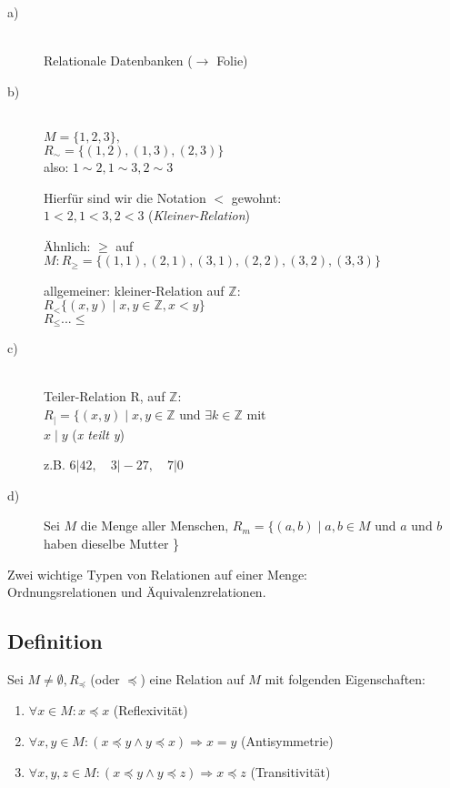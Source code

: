 \documentclass[a4paper, 12pt, twoside] {article}
\begin{document}
\begin{description}
\item[a)] \hfill \\
Relationale Datenbanken ($\rightarrow$ Folie)

\item[b)] \hfill \\
$M = \{1, 2, 3 \} ,$ \\
$R_{\sim} = \{(1, 2), (1, 3), (2, 3) \}$ \\
also: $1 \sim 2, 1  \sim 3, 2  \sim 3$

Hierfür sind wir die Notation \textit{$<$} gewohnt: \\
$1 < 2, 1 < 3, 2 < 3$ (\textit{Kleiner-Relation})

Ähnlich: $\geq$ auf $M: R_{\geq} = \{(1, 1), (2, 1), (3, 1), (2, 2), (3, 2), (3, 3) \}$

allgemeiner: kleiner-Relation auf $\mathbb{Z}$: \\
$R_{<} \{(x, y) \mid x, y \in \mathbb{Z}, x < y \}$ \\
$R_{\leq} ... \leq$

\item[c)] \hfill \\
Teiler-Relation R, auf $\mathbb{Z}$: \\
$R_{|} = \{(x, y) \mid x, y \in \mathbb{Z}$ und $ \exists k \in \mathbb{Z}$ mit \\
$x \mid y$ (\textit{x teilt y})

z.B. $6|42, \quad 3|-27, \quad 7|0$

\item[d)] Sei $M$ die Menge aller Menschen, $R_m = \{(a, b) \mid a, b \in M$ und $a$ und $b$ haben dieselbe Mutter \}

\end{description}

Zwei wichtige Typen von Relationen auf einer Menge: \\
Ordnungsrelationen und Äquivalenzrelationen.

\subsection[Definition (Ordnungsrelation, partielle/totale/vollständige/lineare Ordnung)]{Definition} %
Sei $M \neq \emptyset, R_{\preceq}$ (oder $\preceq$) eine Relation auf $M$ mit folgenden Eigenschaften:

\begin{enumerate}

\item $\forall x \in M: x \preceq x$ (Reflexivität)

\item $\forall x, y \in M: (x \preceq y \wedge y \preceq x) \Rightarrow x = y$ (Antisymmetrie)

\item $\forall x, y, z \in M: (x \preceq y \wedge y \preceq z) \Rightarrow x \preceq z$ (Transitivität)

\end{enumerate}
\end{document}
